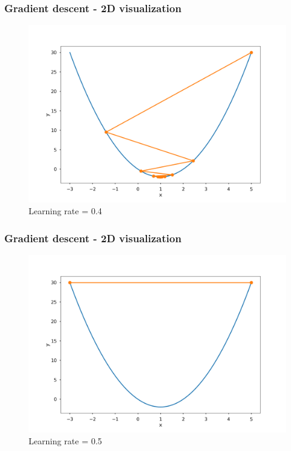 \documentclass{beamer}
\begin{document}
	\begin{frame}
		\frametitle{Gradient descent - 2D visualization}
		\begin{figure}
			\centering
			\includegraphics[scale=0.3]{images/gradient_descent_2}
			\caption{Learning rate = 0.4}
		\end{figure}
	\end{frame}

	\begin{frame}
		\frametitle{Gradient descent - 2D visualization}
		\begin{figure}
			\centering
			\includegraphics[scale=0.3]{images/gradient_descent_3}
			\caption{Learning rate = 0.5}
		\end{figure}
	\end{frame}
\end{document}
